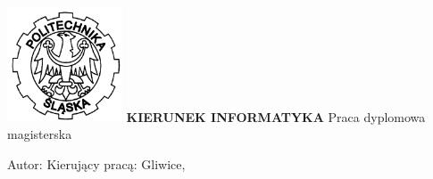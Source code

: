 \begin{titlepage}
  \begin{center}
    \vspace*{5.1mm}
    \includegraphics[width=3.41cm]{logo}
    \vskip 1.58cm
    \vskip 6.1mm
    \vskip 4.6mm
    {\textbf{\uppercase{\textsf{\large K{\normalsize ierunek} I{\normalsize nformatyka}}}}}
    \vskip 2.3cm
    \textsf{\LARGE Praca dyplomowa magisterska}
    \vskip 1.8cm
    \begin{onehalfspace}
      \textsf{\large \tytul}
    \end{onehalfspace}
  \end{center}
  \vfill

  \noindent\textsf{\large Autor: \autor}
  \vskip 3mm
  \noindent\textsf{\large Kierujący pracą: \promotor}
  \noindent\textsf{Gliwice, \data}
  \vspace*{2mm}
\end{titlepage}
